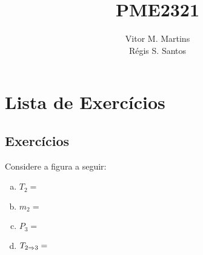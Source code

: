 \documentclass[a4paper,12pt]{memoir}
\title{PME2321}
\author{Vitor M. Martins\\ R\'egis S. Santos}
\date{}
\begin{document}
\begin{titlingpage}
  \maketitle
\end{titlingpage}

\tableofcontents

\chapter{Lista de Exercícios}

\section{Exercícios}

\begin{Exerc}[9.69 6\pa Ed.]
Considere a figura a seguir:

 
\begin{enumerate}[a)]
  \item $T_2 =$
  \item $m_2 =$
  \item $P_3 =$
  \item $T_{2 \Rightarrow 3} =$
\end{enumerate}
\end{Exerc}
\end{document}
